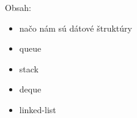 




Obsah:
\begin{itemize}
    \item načo nám sú dátové štruktúry
    \item queue
    \item stack
    \item deque
    \item linked-list
\end{itemize}


